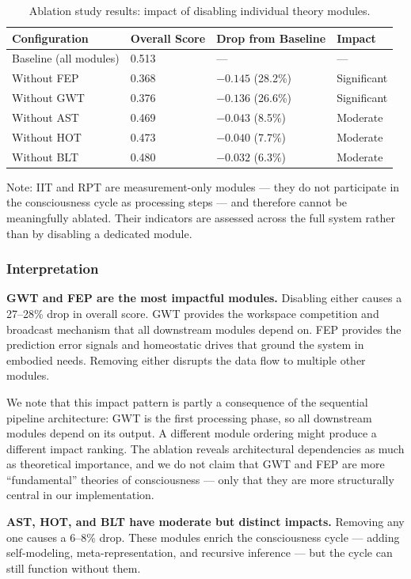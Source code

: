 \begin{table}[t]
\centering
\begin{tabular}{llll}
\toprule
Configuration & Overall Score & Drop from Baseline & Impact \\
\midrule
Baseline (all modules) & 0.513 & --- & --- \\
Without FEP & 0.368 & $-0.145$ (28.2\%) & Significant \\
Without GWT & 0.376 & $-0.136$ (26.6\%) & Significant \\
Without AST & 0.469 & $-0.043$ (8.5\%) & Moderate \\
Without HOT & 0.473 & $-0.040$ (7.7\%) & Moderate \\
Without BLT & 0.480 & $-0.032$ (6.3\%) & Moderate \\
\bottomrule
\end{tabular}
\caption{Ablation study results: impact of disabling individual theory modules.}
\label{tab:ablation}
\end{table}

Note: IIT and RPT are measurement-only modules --- they do not participate in the consciousness cycle as processing steps --- and therefore cannot be meaningfully ablated. Their indicators are assessed across the full system rather than by disabling a dedicated module.

\subsubsection{Interpretation}

\textbf{GWT and FEP are the most impactful modules.} Disabling either causes a 27--28\% drop in overall score. GWT provides the workspace competition and broadcast mechanism that all downstream modules depend on. FEP provides the prediction error signals and homeostatic drives that ground the system in embodied needs. Removing either disrupts the data flow to multiple other modules.

We note that this impact pattern is partly a consequence of the sequential pipeline architecture: GWT is the first processing phase, so all downstream modules depend on its output. A different module ordering might produce a different impact ranking. The ablation reveals architectural dependencies as much as theoretical importance, and we do not claim that GWT and FEP are more ``fundamental'' theories of consciousness --- only that they are more structurally central in our implementation.

\textbf{AST, HOT, and BLT have moderate but distinct impacts.} Removing any one causes a 6--8\% drop. These modules enrich the consciousness cycle --- adding self-modeling, meta-representation, and recursive inference --- but the cycle can still function without them.

